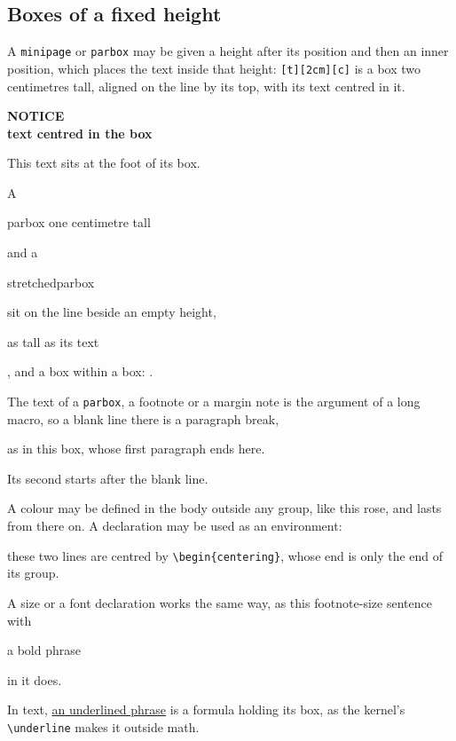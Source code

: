 \documentclass{article}
\numberwithin{equation}{section}
\theoremstyle{definition}
\theoremstyle{remark}
\begin{document}
\subsection{Boxes of a fixed height}\label{sec:boxheight}
A \texttt{minipage} or \texttt{parbox} may be given a height after its position and then an
inner position, which places the text inside that height: \texttt{[t][2cm][c]} is a box two
centimetres tall, aligned on the line by its top, with its text centred in it.

\noindent\begin{minipage}[t][2cm][c]{0.3\textwidth}
\centering\sffamily\bfseries\large NOTICE\\[3pt]\normalsize text centred in the box
\end{minipage}\hfill
\begin{minipage}[t][2cm][b]{0.3\textwidth}
This text sits at the foot of its box.
\end{minipage}\hfill
{}

\medskip
A \parbox[b][1cm]{2.5cm}{parbox one centimetre tall} and a
\parbox[c][1.6cm][s]{2.5cm}{stretched\vfill parbox} sit on the line beside an empty height,
\parbox[t][]{2cm}{as tall as its text}, and a box within a box:
.

The text of a \texttt{parbox}, a footnote or a margin note is the argument of a long
macro, so a blank line there is a paragraph break, \parbox[t]{0.35\textwidth}{as in this
box, whose first paragraph ends here.

Its second starts after the blank line.} A colour may be defined in the body outside
any group, \textcolor{rtrose}{like this rose}, and lasts from there on. A declaration
may be used as an environment:
\begin{centering}
these two lines are centred by \texttt{\textbackslash begin\{centering\}}, whose end is
only the end of its group.\par
\end{centering}
\begin{footnotesize}A size or a font declaration works the same way, as this
footnote-size sentence with \begin{bfseries}a bold phrase\end{bfseries} in it does.\end{footnotesize}
In text, \underline{an underlined phrase} is a formula holding its box, as the kernel's
\verb|\underline| makes it outside math.
\end{document}

